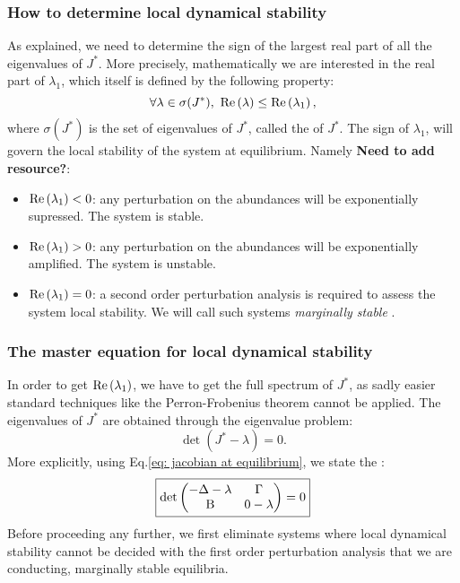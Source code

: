 \documentclass[12pt, titlepage]{report}
\begin{document}
\subsubsection{How to determine local dynamical stability}
As explained, we need to determine the sign of the largest real part of all the eigenvalues of $J^*$.
More precisely, mathematically we are interested in the real part of $\lambda_1$, which itself is defined by the following property:
\begin{equation}
\forall \lambda \in \sigma(J^*), \ \text{Re}\left(\lambda\right) \leq \text{Re}\left(\lambda_1\right),
\end{equation}
where $\sigma(J^*)$ is the set of eigenvalues of $J^*$, called the  of $J^*$.
The sign of $\lambda_1$, will govern the local stability of the system at equilibrium. Namely \textbf{Need to add resource?}:
\begin{itemize}
\item $\text{Re}\left(\lambda_1\right) < 0$: any perturbation on the abundances will be exponentially supressed. The system is stable.
\item $\text{Re}\left(\lambda_1\right) > 0$: any perturbation on the abundances will be exponentially amplified. The system is unstable.
\item $\text{Re}\left(\lambda_1\right)=0$: a second order perturbation analysis is required to assess the system local stability. We will call such systems \textit{marginally stable} \cite{biroli_marginally_2018}.
\end{itemize}

\subsubsection{The master equation for local dynamical stability}
In order to get $\text{Re}\left(\lambda_1\right)$, we have to get the full spectrum of $J^*$, as sadly easier standard techniques like the Perron-Frobenius theorem \cite{perron_zur_nodate} cannot be applied. The eigenvalues of $J^*$ are obtained through the eigenvalue problem:
\begin{equation}
\det\left(J^* - \lambda \right) = 0.
\end{equation}
More explicitly, using Eq.\eqref{eq: jacobian at equilibrium}, we state the :
\begin{equation}
\boxed{
\det
\begin{pmatrix}
 -\Delta - \lambda  & \Gamma \\
 \text{B} & 0-\lambda
\end{pmatrix} = 0
}\label{eq: master equation eigenvalues jacobian}
\end{equation}
Before proceeding any further, we first eliminate systems where local dynamical stability cannot be decided with the first order perturbation analysis that we are conducting, \ie marginally stable equilibria.
\end{document}

